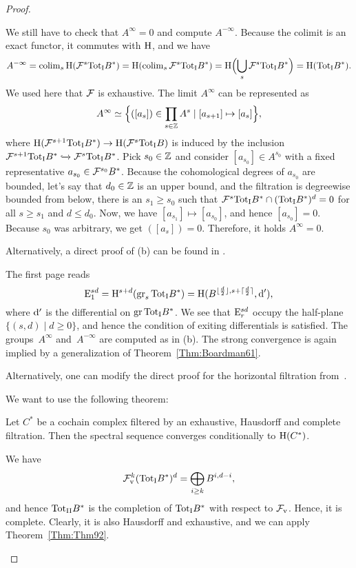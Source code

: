 \documentclass[\MainFolder/Text.tex]{subfiles}
\begin{document}
\begin{proof}
\begin{ProofList}
We still have to check that $A^{\infty}=0$ and compute $A^{-\infty}$. Because the colimit is an exact functor, it commutes with $\mathrm{H}$, and we have
$$ A^{-\infty} = \operatorname{colim}_s \mathrm{H}(\mathcal{F}^s{\mathrm{Tot}_{\mathrm{I}}} B^*) = \mathrm{H}(\operatorname{colim}_s\mathcal{F}^s{\mathrm{Tot}_{\mathrm{I}}} B^*) = \mathrm{H}\Bigl(\bigcup_s \mathcal{F}^s {\mathrm{Tot}_{\mathrm{I}}} B^*\Bigr) = \mathrm{H}({\mathrm{Tot}_{\mathrm{I}}} B^*). $$
We used here that $\mathcal{F}$ is exhaustive. The limit $A^\infty$ can be represented as
$$ A^\infty \simeq \Bigl\{([a_s]) \in \prod_{s\in \mathbb{Z}} A^s \mid [a_{s+1}]\mapsto [a_s]\Bigr\}, $$
where $\mathrm{H}(\mathcal{F}^{s+1}{\mathrm{Tot}_{\mathrm{I}}} B^*) \rightarrow \mathrm{H}(\mathcal{F}^s {\mathrm{Tot}_{\mathrm{I}}} B)$ is induced by the inclusion $\mathcal{F}^{s+1}{\mathrm{Tot}_{\mathrm{I}}} B^* \xhookrightarrow{} \mathcal{F}^s {\mathrm{Tot}_{\mathrm{I}}} B^*$. Pick $s_0\in \mathbb{Z}$ and consider $[a_{s_0}] \in A^{s_0}$ with a fixed representative $a_{s_0}\in \mathcal{F}^{s_0} B^*$. Because the cohomological degrees of $a_{s_0}$ are bounded, let's say that $d_0\in \mathbb{Z}$ is an upper bound, and the filtration is degreewise bounded from below, there is an $s_1 \ge s_0$ such that $\mathcal{F}^{s} {\mathrm{Tot}_{\mathrm{I}}} B^* \cap ({\mathrm{Tot}_{\mathrm{I}}} B^*)^{d} = 0$ for all $s\ge s_1$ and $d\le d_0$. Now, we have $[a_{s_1}] \mapsto [a_{s_0}]$, and hence $[a_{s_0}] = 0$. Because $s_0$ was arbitrary, we get $([a_s]) = 0$. Therefore, it holds $A^\infty=0$.

Alternatively, a direct proof of (b) can be found in \cite{Cencelj1998}.

\item The first page reads
$$\mathrm{E}_1^{sd} = \mathrm{H}^{s+d}(\operatorname{\mathrm{gr}}_s {\mathrm{Tot}_{\mathrm{I}}} B^*) = \mathrm{H}(B^{\lfloor\frac{d}{2}\rfloor,s+\lceil\frac{d}{2}\rceil},\mathrm{d}'), $$
where $\mathrm{d}'$ is the differential on $\operatorname{\mathrm{gr}} {\mathrm{Tot}_{\mathrm{I}}} B^*$. We see that $\mathrm{E}_r^{sd}$ occupy the half-plane $\{(s,d)\mid d\ge 0\}$, and hence the condition of exiting differentials is satisfied. The groups~$A^\infty$ and~$A^{-\infty}$ are computed as in (b). The strong convergence is again implied by a generalization of Theorem~\ref{Thm:Boardman61}.

Alternatively, one can modify the direct proof for the horizontal filtration from~\cite{Cencelj1998}.

\item We want to use the following theorem:
\begin{ProofTheorem}\label{Thm:Thm92}
Let $C^*$ be a cochain complex filtered by an exhaustive, Hausdorff and complete filtration. Then the spectral sequence converges conditionally to $\mathrm{H}(C^*)$.
\end{ProofTheorem}
We have
$$ \mathcal{F}^k_{{\mathrm{v}}} ({\mathrm{Tot}_{\mathrm{I}}} B^*)^d = \bigoplus_{i\ge k} B^{i,d-i}, $$
and hence ${\mathrm{Tot}_{\mathrm{II}}} B^*$ is the completion of ${\mathrm{Tot}_{\mathrm{I}}} B^*$ with respect to $\mathcal{F}_{{\mathrm{v}}}$. Hence, it is complete. Clearly, it is also Hausdorff and exhaustive, and we can apply Theorem~\ref{Thm:Thm92}.


\end{ProofList}
\end{proof}
\end{document}
